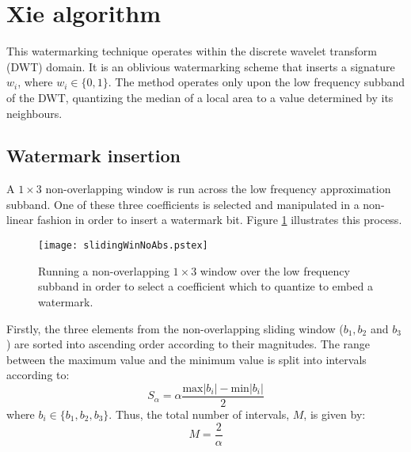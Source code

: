 \documentclass[12pt]{article}
\begin{document}
\section{Xie algorithm}

This watermarking technique \cite{xie1} operates within the discrete wavelet transform (DWT) domain. It 
is an oblivious watermarking scheme that inserts a signature $w_{i}$, where $w_{i} \in \{0,1\}$.
The method operates only upon the low frequency subband of the DWT, quantizing 
the median of a local area to a value determined by its neighbours.

\subsection{Watermark insertion}
A $1 \times 3$ non-overlapping window is run across the low frequency approximation subband. 
One of these three coefficients is selected and manipulated in a non-linear fashion 
in order to insert a watermark bit. Figure \ref{slidingWin} illustrates this process.

\begin{figure}[htb]
	\begin{center}
		\texttt{[image: slidingWinNoAbs.pstex]}
		\caption{Running a non-overlapping $1 \times 3$ window over the low frequency
			subband in order to select a coefficient which to quantize to 
			embed a watermark.}
		\label{slidingWin}
	\end{center}
\end{figure}

Firstly, the three elements from the non-overlapping sliding window ($b_{1}, b_{2}$ and $b_{3}$) are sorted into 
ascending order according
to their magnitudes. The range between the maximum value and the minimum value is split into
intervals according to:
\begin{equation}
	S_{\alpha} = \alpha \frac{ \mbox{max}|b_{i}| - \mbox{min}|b_{i}| }{2}
\end{equation}
where $b_{i} \in \{b_{1}, b_{2}, b_{3}\}$. Thus, the total number of intervals, $M$, is given by:
\begin{equation}
	M = \frac{2}{\alpha}
\end{equation}
\end{document}
